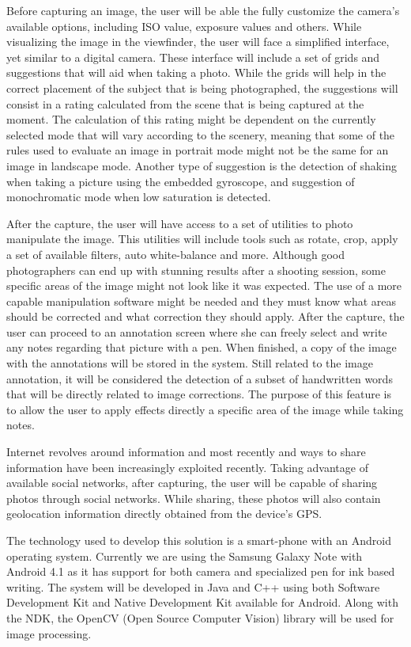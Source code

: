 Before capturing an image, the user will be able the fully customize the camera's available options, including ISO value, exposure values and others. While visualizing the image in the viewfinder, the user will face a simplified interface, yet similar to a digital camera. 
These interface will include a set of grids and suggestions that will aid when taking a photo. While the grids will help in the correct placement of the subject that is being photographed, the suggestions will consist in a rating calculated from the scene that is being captured at the moment. 
The calculation of this rating might be dependent on the currently selected mode that will vary according to the scenery, meaning that some of the rules used to evaluate an image in portrait mode might not be the same for an image in landscape mode. Another type of suggestion is the detection of shaking when taking a picture using the embedded gyroscope, and suggestion of monochromatic mode when low saturation is detected.

After the capture, the user will have access to a set of utilities to photo manipulate the image. This utilities will include tools such as rotate, crop, apply a set of available filters, auto white-balance and  more.
Although good photographers can end up with stunning results after a shooting session, some specific areas of the image might not look like it was expected. The use of a more capable manipulation software might be needed and they must know what areas should be corrected and what correction they should apply. After the capture, the user can proceed to an annotation screen where she can freely select and write any notes regarding that picture with a pen. When finished, a copy of the image with the annotations will be stored in the system. Still related to the image annotation, it will be considered the detection of a subset of handwritten words that will be directly related to image corrections. The purpose of this feature is to allow the user to apply effects directly a specific area of the image while taking notes.

Internet revolves around information and most recently and ways to share information have been increasingly exploited recently. Taking advantage of available social networks, after capturing, the user will be capable of sharing photos through social networks. While sharing, these photos will also contain geolocation information directly obtained from the device's GPS.

The technology used to develop this solution is a smart-phone with an Android operating system. Currently we are using the Samsung Galaxy Note with Android 4.1 as it has support for both camera and specialized pen for ink based writing. The system will be developed in Java and C++ using both Software Development Kit \cite{SDK} and Native Development Kit \cite{NDK} available for Android.  Along with the NDK, the OpenCV (Open Source Computer Vision) \cite{OCV} library will be used for image processing.

